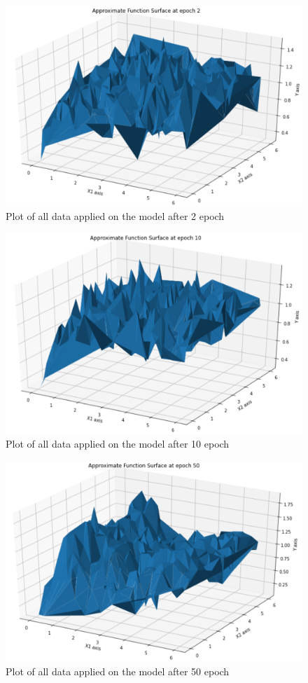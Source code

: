 \documentclass[10pt,a4paper]{article}
\begin{document}
\begin{figure}[htbp]
    \centering
    \includegraphics[width=0.8\linewidth]{Ep2.png}
    \captionsetup{justification=centering}
    \caption{Plot of all data applied on the model after 2 epoch}
\end{figure}
\begin{figure}[htbp]
    \centering
    \includegraphics[width=0.8\linewidth]{Ep10.png}
    \captionsetup{justification=centering}
    \caption{Plot of all data applied on the model after 10 epoch}
\end{figure}
\begin{figure}[htbp]
    \centering
    \includegraphics[width=0.8\linewidth]{Ep50.png}
    \captionsetup{justification=centering}
    \caption{Plot of all data applied on the model after 50 epoch}
\end{figure}
\end{document}
